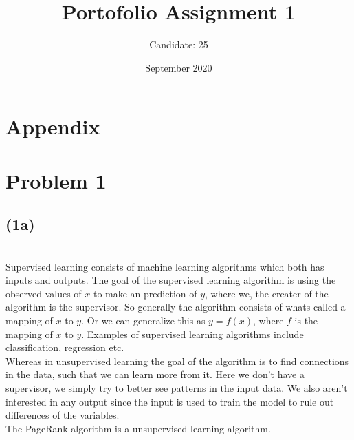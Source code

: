 \documentclass[12pt, letterpaper]{article}
\title{Portofolio Assignment 1}
\author{Candidate: 25}
\date{September 2020}
\begin{document}
  \maketitle
  \section*{Appendix}
  \newpage
  \section*{Problem 1}
    \subsection*{(1a)} \\
    Supervised learning consists of machine learning algorithms which both has inputs and outputs. The goal of the supervised learning algorithm is using the observed values of $x$ to make an prediction of $y$, where we, the creater of the algorithm is the supervisor. So generally the algorithm consists of whats called a mapping of $x$ to $y$. Or we can generalize this as $y = f(x)$, where $f$ is the mapping of $x$ to $y$. Examples of supervised learning algorithms include classification, regression etc.\\
    \newline
    Whereas in unsupervised learning the goal of the algorithm is to find connections in the data, such that we can learn more from it. Here we don't have a supervisor, we simply try to better see patterns in the input data. We also aren't interested in any output since the input is used to train the model to rule out differences of the variables.\\
    \newline
    The PageRank algorithm is a unsupervised learning algorithm.

    \newline
\end{document}
